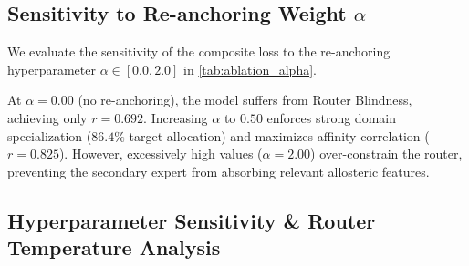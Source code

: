 \documentclass{article}
\theoremstyle{definition}
\begin{document}
\subsection{Sensitivity to Re-anchoring Weight \texorpdfstring{$\alpha$}{alpha}}
We evaluate the sensitivity of the composite loss to the re-anchoring hyperparameter $\alpha \in [0.0, 2.0]$ in \cref{tab:ablation_alpha}.

\begin{table}[!ht]
\centering
\small
\caption{\textbf{Sensitivity Analysis of Re-anchoring Loss Weight $\alpha$.} Impact of the contrastive re-anchoring penalty weight on affinity correlation, target routing allocation, and routing entropy. \emph{Simulation output (\cref{sec:evidentiary_scope}).}}
\label{tab:ablation_alpha}
\end{table}

At $\alpha = 0.00$ (no re-anchoring), the model suffers from Router Blindness, achieving only $r = 0.692$. Increasing $\alpha$ to $0.50$ enforces strong domain specialization ($86.4\%$ target allocation) and maximizes affinity correlation ($r = 0.825$). However, excessively high values ($\alpha = 2.00$) over-constrain the router, preventing the secondary expert from absorbing relevant allosteric features.

\subsection{Hyperparameter Sensitivity \& Router Temperature Analysis}
\label{subsec:temperature_analysis}
\end{document}
